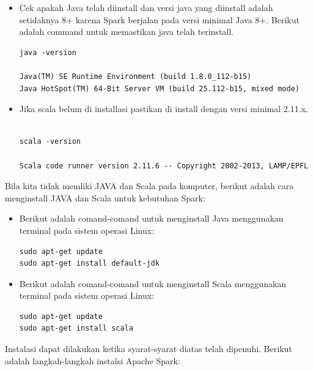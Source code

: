 \documentclass[a4paper,twoside]{article}
\begin{document}
\begin{enumerate}
\begin{itemize}

\item Cek apakah Java telah diinstall dan versi java yang diinstall adalah setidaknya 8+ karena Spark berjalan pada versi minimal Java 8+. Berikut adalah command untuk memastikan java telah terinstall.

\begin{verbatim}
java -version

Java(TM) SE Runtime Environment (build 1.8.0_112-b15)                                                                   Java HotSpot(TM) 64-Bit Server VM (build 25.112-b15, mixed mode) 

\end{verbatim}


\item Jika scala belum di installasi pastikan di install dengan versi minimal 2.11.x. 

\begin{verbatim}

scala -version

Scala code runner version 2.11.6 -- Copyright 2002-2013, LAMP/EPFL

\end{verbatim}

\end{itemize} 

Bila kita tidak memliki JAVA dan Scala pada komputer, berikut adalah cara menginstall JAVA dan Scala untuk kebutuhan Spark:

\begin{itemize}

\item Berikut adalah comand-comand untuk menginstall Java menggunakan terminal pada sistem operasi Linux:

\begin{verbatim}
sudo apt-get update
sudo apt-get install default-jdk
\end{verbatim}

\item Berikut adalah comand-comand untuk menginstall Scala menggunakan terminal pada sistem operasi Linux:

\begin{verbatim}
sudo apt-get update
sudo apt-get install scala
\end{verbatim}

\end{itemize}


Instalasi dapat dilakukan ketika syarat-syarat diatas telah dipenuhi. Berikut adalah langkah-langkah instalsi Apache Spark:


\end{enumerate}
\end{document}

